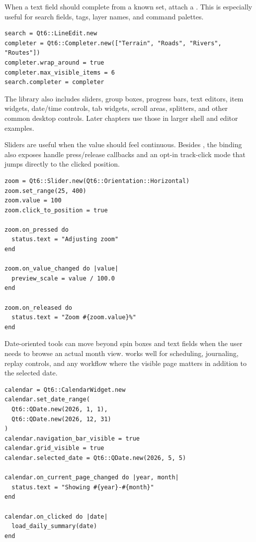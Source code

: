When a text field should complete from a known set, attach a . This is especially useful for search fields, tags, layer names, and command palettes.

\begin{lstlisting}[style=crystal]
search = Qt6::LineEdit.new
completer = Qt6::Completer.new(["Terrain", "Roads", "Rivers", "Routes"])
completer.wrap_around = true
completer.max_visible_items = 6
search.completer = completer
\end{lstlisting}

The  library also includes sliders, group boxes, progress bars, text editors, item widgets, date/time controls, tab widgets, scroll areas, splitters, and other common desktop controls. Later chapters use those in larger shell and editor examples.

Sliders are useful when the value should feel continuous. Besides , the binding also exposes handle press/release callbacks and an opt-in track-click mode that jumps directly to the clicked position.

\begin{lstlisting}[style=crystal]
zoom = Qt6::Slider.new(Qt6::Orientation::Horizontal)
zoom.set_range(25, 400)
zoom.value = 100
zoom.click_to_position = true

zoom.on_pressed do
  status.text = "Adjusting zoom"
end

zoom.on_value_changed do |value|
  preview_scale = value / 100.0
end

zoom.on_released do
  status.text = "Zoom #{zoom.value}%"
end
\end{lstlisting}

Date-oriented tools can move beyond spin boxes and text fields when the user needs to browse an actual month view.  works well for scheduling, journaling, replay controls, and any workflow where the visible page matters in addition to the selected date.

\begin{lstlisting}[style=crystal]
calendar = Qt6::CalendarWidget.new
calendar.set_date_range(
  Qt6::QDate.new(2026, 1, 1),
  Qt6::QDate.new(2026, 12, 31)
)
calendar.navigation_bar_visible = true
calendar.grid_visible = true
calendar.selected_date = Qt6::QDate.new(2026, 5, 5)

calendar.on_current_page_changed do |year, month|
  status.text = "Showing #{year}-#{month}"
end

calendar.on_clicked do |date|
  load_daily_summary(date)
end
\end{lstlisting}

